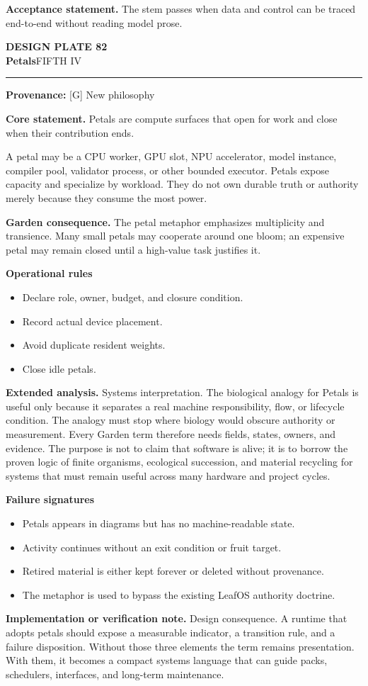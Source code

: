 \documentclass[10pt,letterpaper,oneside]{article}
\newcommand{\prov}[1]{\textcolor{gardenBlue}{\sffamily\footnotesize\textbf{Provenance:} #1}}
\newcommand{\platetitle}[3]{%
  \begin{minipage}[t][0.54in][t]{\textwidth}
  {\sffamily\bfseries\color{gardenDeep}\fontsize{9}{10}\selectfont DESIGN PLATE #1}\\[-1pt]
  {\sffamily\bfseries\color{gardenInk}\fontsize{16.5}{18}\selectfont #2}\hfill{\sffamily\color{gardenGreen}\large #3}
  \end{minipage}\vspace{-2pt}\hrule\vspace{5pt}}
\begin{document}
\begin{acceptbox}
\textbf{Acceptance statement.} The stem passes when data and control can be traced end-to-end without reading model prose.
\end{acceptbox}
\newpage
\platetitle{82}{Petals}{FIFTH IV}
\prov{[G] New philosophy}
\fontsize{8.85}{10.45}\selectfont
\begin{corebox}
\textbf{Core statement.} Petals are compute surfaces that open for work and close when their contribution ends.
\end{corebox}
A petal may be a CPU worker, GPU slot, NPU accelerator, model instance, compiler pool, validator process, or other bounded executor. Petals expose capacity and specialize by workload. They do not own durable truth or authority merely because they consume the most power.

\textbf{Garden consequence.} The petal metaphor emphasizes multiplicity and transience. Many small petals may cooperate around one bloom; an expensive petal may remain closed until a high-value task justifies it.

\textbf{Operational rules}
\begin{itemize}
\item Declare role, owner, budget, and closure condition.
\item Record actual device placement.
\item Avoid duplicate resident weights.
\item Close idle petals.
\end{itemize}
\textbf{Extended analysis.} Systems interpretation. The biological analogy for Petals is useful only because it separates a real machine responsibility, flow, or lifecycle condition. The analogy must stop where biology would obscure authority or measurement. Every Garden term therefore needs fields, states, owners, and evidence. The purpose is not to claim that software is alive; it is to borrow the proven logic of finite organisms, ecological succession, and material recycling for systems that must remain useful across many hardware and project cycles.

\textbf{Failure signatures}
\begin{itemize}
\item Petals appears in diagrams but has no machine-readable state.
\item Activity continues without an exit condition or fruit target.
\item Retired material is either kept forever or deleted without provenance.
\item The metaphor is used to bypass the existing LeafOS authority doctrine.
\end{itemize}
\textbf{Implementation or verification note.} Design consequence. A runtime that adopts petals should expose a measurable indicator, a transition rule, and a failure disposition. Without those three elements the term remains presentation. With them, it becomes a compact systems language that can guide packs, schedulers, interfaces, and long-term maintenance.
\end{document}
